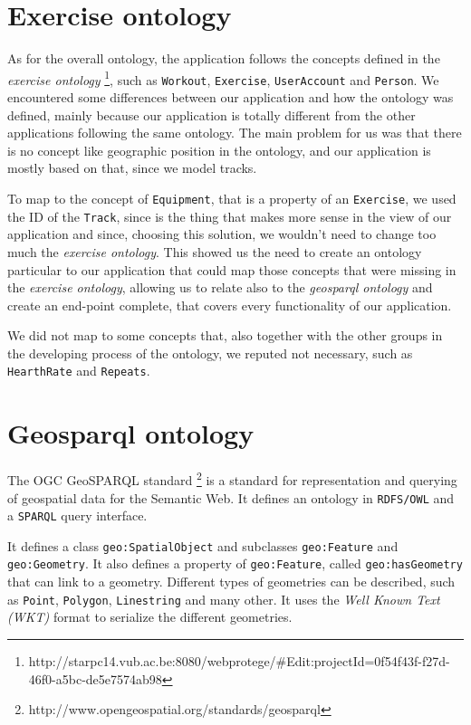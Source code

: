 \documentclass[11pt,a4paper]{scrreprt}
\begin{document}
\section{Exercise ontology}
As for the overall ontology, the application follows the concepts defined in the \textit{exercise ontology} \footnote{http://starpc14.vub.ac.be:8080/webprotege/\#Edit:projectId=0f54f43f-f27d-46f0-a5bc-de5e7574ab98}, such as \texttt{Workout}, \texttt{Exercise}, \texttt{UserAccount} and \texttt{Person}. 
We encountered some differences between our application and how the ontology was defined, mainly because our application is totally different from the other applications following the same ontology. The main problem for us was that there is no concept like geographic position in the ontology, and our application is mostly based on that, since we model tracks. 

To map to the concept of \texttt{Equipment}, that is a property of an \texttt{Exercise}, we used the ID of the \texttt{Track}, since is the thing that makes more sense in the view of our application and since, choosing this solution, we wouldn't need to change too much the \textit{exercise ontology}. 
This showed us the need to create an ontology particular to our application that could map those concepts that were missing in the \textit{exercise ontology}, allowing us to relate also to the \textit{geosparql ontology} and create an end-point complete, that covers every functionality of our application.

We did not map to some concepts that, also together with the other groups in the developing process of the ontology, we reputed not necessary, such as \texttt{HearthRate} and \texttt{Repeats}.
\section{Geosparql ontology}
The OGC GeoSPARQL standard \footnote{http://www.opengeospatial.org/standards/geosparql} is a standard for representation and querying of geospatial data for the Semantic Web. It defines an ontology in \texttt{RDFS/OWL} and a \texttt{SPARQL} query interface.

It defines a class \texttt{geo:SpatialObject} and subclasses \texttt{geo:Feature} and \texttt{geo:Geometry}. It also defines a property of \texttt{geo:Feature}, called \texttt{geo:hasGeometry} that can link to a geometry.
Different types of geometries can be described, such as \texttt{Point}, \texttt{Polygon}, \texttt{Linestring} and many other.
It uses the \textit{Well Known Text (WKT)} format to serialize the different geometries.
\end{document}
